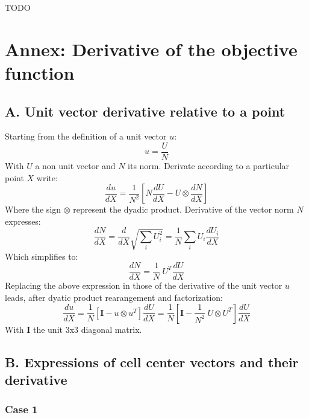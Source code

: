 \documentclass[11pt]{article}
\begin{document}
TODO







\clearpage


\section*{Annex: Derivative of the objective function}

\subsection*{A. Unit vector derivative relative to a point}
Starting from the definition of a unit vector $u$:
\begin{equation}
u = \frac{U}{N}
\end{equation}
With $U$ a non unit vector and $N$ its norm.
Derivate according to a particular point $X$ write:
\begin{equation}
\frac{du}{dX} = \frac{1}{N^2} \left[ N \frac{dU}{dX} - U \otimes \frac{dN}{dX} \right]
\end{equation}
Where the sign $\otimes$ represent the dyadic product. Derivative of the vector norm $N$ expresses:
\begin{equation}
\frac{dN}{dX} = \frac{d}{dX} \sqrt{\sum_i U_i^2} =
\frac{1}{N} \sum_i U_i \frac{dU_i}{dX}
\end{equation}
Which simplifies to:
\begin{equation}
\frac{dN}{dX} = \frac{1}{N}\ U^T \frac{dU}{dX}
\end{equation}
Replacing the above expression in those of the derivative of the unit vector $u$ leads, after dyatic product rearangement and factorization:
\begin{equation}
\frac{du}{dX} = \frac{1}{N} \left[ \boldsymbol{I} - u \otimes u^T \right] \frac{dU}{dX} = \frac{1}{N} \left[ \boldsymbol{I} - \frac{1}{N^2}\ U \otimes U^T \right] \frac{dU}{dX}
\end{equation}
With $\boldsymbol{I}$ the unit 3x3 diagonal matrix.


\subsection*{B. Expressions of cell center vectors and their derivative}

\subsubsection*{Case 1}
\end{document}
